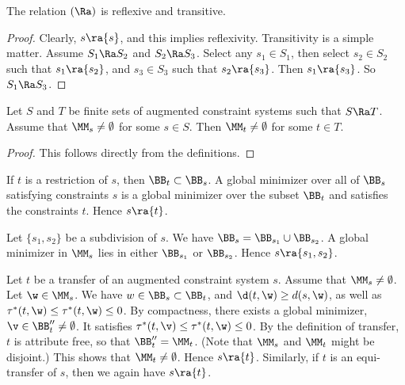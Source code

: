 \begin{lemma}
The relation $(\Ra)$  is reflexive and transitive.
\end{lemma}

\begin{proof}  Clearly, $s\ra \{s\}$, and this implies reflexivity.
Transitivity is a simple matter.  Assume
$S_1\Ra S_2$ and $S_2\Ra S_3$.  Select any $s_1\in S_1$, then select
$s_2\in S_2$ such that $s_1\ra \{s_2\}$, and $s_3\in S_3$ such
that $s_2\ra \{s_3\}$.  Then $s_1\ra\{s_3\}$.  So $S_1\Ra S_3$.
\end{proof}

\begin{lemma}\label{lemma:propagate}
Let $S$  and $T$ be finite sets of augmented constraint systems such that
$S\Ra T$.  Assume that $\MM_s\ne\emptyset$ for some $s\in S$.
Then $\MM_t\ne\emptyset$ for some $t\in T$.
\end{lemma}

\begin{proof} This follows directly from the definitions. 
\end{proof}

\begin{example}[restriction]
If $t$ is a restriction of $s$, then $\BB_t\subset \BB_s$.
A global minimizer over all of $\BB_s$ satisfying constraints $s$ is
a global minimizer over the subset $\BB_t$ and satisfies the
constraints $t$.  Hence $s\ra\{t\}$.
\end{example}

\begin{example}[subdivision]
Let $\{s_1,s_2\}$ be a subdivision of $s$.  We have $\BB_s =
\BB_{s_1}\cup \BB_{s_2}$.  A global minimizer in $\MM_s$ lies in
either $\BB_{s_1}$ or $\BB_{s_2}$.  Hence $s\ra\{s_1,s_2\}$.
\end{example}

\begin{example}  Let $t$ be a transfer of
an augmented constraint system $s$.  Assume that $\MM_s\ne\emptyset$.
Let $\w\in \MM_s$.
We have $w\in \BB_s\subset\BB_t$, and $\d(t,\w) \ge d(s,\w)$,
as well as $\tau^*(t,\w)\le\tau^*(t,\w)\le 0$.   By compactness, there
exists a global minimizer,
$\v\in\BB''_t\ne\emptyset$.  It satisfies
$\tau^*(t,\v)\le\tau^*(t,\w)\le 0$.  By the definition of transfer,
$t$
is attribute free, so that $\BB''_t=\MM_t$.  (Note that $\MM_s$ and
$\MM_t$
might be disjoint.)  This shows that
$\MM_t\ne\emptyset$.
Hence $s\ra\{t\}$.  Similarly, if $t$ is an equi-transfer of $s$,
then we again have $s\ra\{t\}$.
\end{example}


